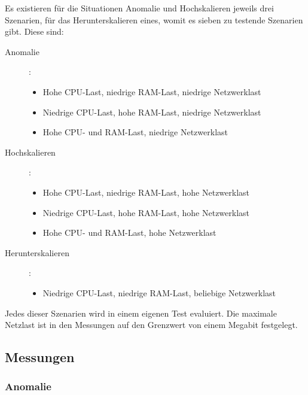 \documentclass[a4paper,10pt]{scrartcl}
\begin{document}
Es existieren für die Situationen Anomalie und Hochskalieren jeweils drei Szenarien, für das Herunterskalieren eines, womit es sieben zu testende Szenarien gibt.
Diese sind:

\begin{description}
\item[Anomalie]:
\begin{itemize}
\item Hohe CPU-Last, niedrige RAM-Last, niedrige Netzwerklast
\item Niedrige CPU-Last, hohe RAM-Last, niedrige Netzwerklast
\item Hohe CPU- und RAM-Last, niedrige Netzwerklast
\end{itemize}
\item[Hochskalieren]:
\begin{itemize}
\item Hohe CPU-Last, niedrige RAM-Last, hohe Netzwerklast
\item Niedrige CPU-Last, hohe RAM-Last, hohe Netzwerklast
\item Hohe CPU- und RAM-Last, hohe Netzwerklast
\end{itemize}
\item[Herunterskalieren]:
\begin{itemize}
\item Niedrige CPU-Last, niedrige RAM-Last, beliebige Netzwerklast
\end{itemize}
\end{description}

Jedes dieser Szenarien wird in einem eigenen Test evaluiert.
Die maximale Netzlast ist in den Messungen auf den Grenzwert von einem Megabit festgelegt.

\subsection{Messungen}

\subsubsection{Anomalie}
\end{document}
